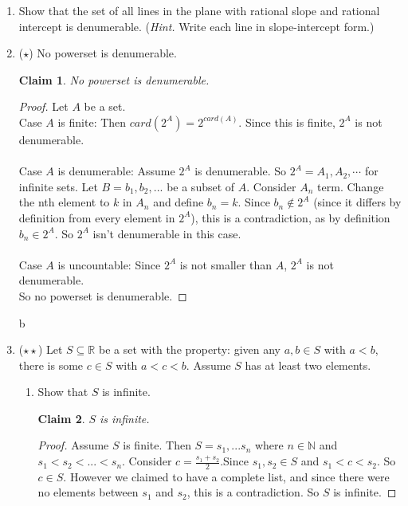 \documentclass[11pt]{letter}
\newtheorem{claim}{Claim}
\theoremstyle{definition}
\begin{document}
\begin{description}
\begin{enumerate}
                  
		
		\item Show that the set of all lines in the plane with rational slope and rational intercept is denumerable. ({\em Hint.} Write each line in slope-intercept form.)
		
		\item ($\star$) No powerset is denumerable.
                  \begin{claim}
                    No powerset is denumerable.
                  \end{claim}
                  \begin{proof}
                    Let $A$ be a set.\\
                    Case $A$ is finite: Then $card(2^A)=2^{card(A)}$. Since this is finite, $2^A$ is not denumerable.\\ \\
                    Case $A$ is denumerable: Assume $2^A$ is denumerable. So $2^A=A_1,A_2 ,\dotsb$ for infinite sets. Let $B=b_1,b_2,...$ be a subset of $A$. Consider $A_n$ term. Change the nth element  to $k$ in $A_n$ and define $b_n=k$. Since $b_n\notin 2^A$ (since it differs by definition from every element in $2^A$), this is a contradiction, as by definition $b_n\in 2^A$. So $2^A$ isn't denumerable in this case.  \\ \\
                    Case $A$ is uncountable: Since $2^A$ is not smaller than $A$, $2^A$ is not denumerable.\\
                    So no powerset is denumerable.
                  \end{proof}
                  
                  
b                  
		
		\item ($\star\star$) Let $S\subseteq \mathbb{R}$ be a set with the property: given any $a,b\in S$ with $a<b$, there is some $c\in S$ with $a<c<b$. Assume $S$ has at least two elements.
			\begin{enumerate}
                        \item Show that $S$ is infinite.
                          \begin{claim}
                            $S$ is infinite.
                          \end{claim}
                          \begin{proof}
                            Assume $S$ is finite. Then $S=s_1,...s_n$ where $n\in \mathbb{N}$ and $s_1<s_2<...<s_n$. Consider $c=\frac{s_1+s_2}{2}$.Since $s_1,s_2\in S$ and $s_1<c<s_2$. So $c\in S$. However we claimed to have a complete list, and since there were no elements between $s_1$ and $s_2$, this is a contradiction. So $S$ is infinite.
                          \end{proof}


\end{enumerate}
\end{enumerate}
\end{description}
\end{document}
